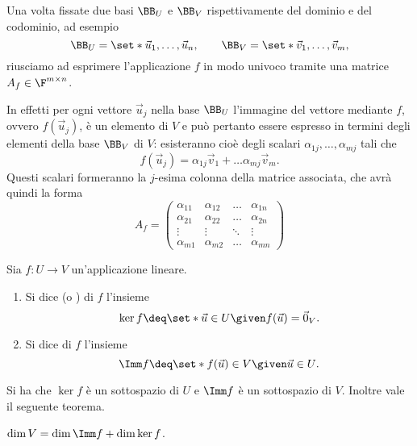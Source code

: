 Una volta fissate due basi $\BB_U$ e $\BB_V$ rispettivamente del dominio e del codominio, ad esempio \[
    \BB_U = \set*{\vec u_1, \dots, \vec u_n}, \qquad \BB_V = \set*{\vec v_1, \dots, \vec v_m},
\] riusciamo ad esprimere l'applicazione $f$ in modo univoco tramite una matrice $A_f \in \Mat{\F, m, n}$. 

In effetti per ogni vettore $\vec u_j$ nella base $\BB_U$ l'immagine del vettore mediante $f$, ovvero $f(\vec u_j)$, è un elemento di $V$ e può pertanto essere espresso in termini degli elementi della base $\BB_V$ di $V$: esisteranno cioè degli scalari $\alpha_{1j}, \dots, \alpha_{mj}$ tali che \[
    f(\vec u_j) = \alpha_{1j}\vec v_1 + \dots \alpha_{mj}\vec v_m.
\] Questi scalari formeranno la $j$-esima colonna della matrice associata, che avrà quindi la forma \[
    A_f = \begin{pmatrix}
        \alpha_{11} &\alpha_{12} &\dots    &\alpha_{1n} \\
        \alpha_{21} &\alpha_{22} &\dots    &\alpha_{2n} \\
        \vdots      &\vdots      &\ddots   &\vdots      \\
        \alpha_{m1} &\alpha_{m2} &\dots    &\alpha_{mn}
    \end{pmatrix}
\]

\begin{definition}
    Sia $f : U \to V$ un'applicazione lineare.
    \begin{enumerate}[(1)]
        \item Si dice  (o ) di $f$ l'insieme \[
            \ker f \deq \set*{\vec u \in U \given f(\vec u) = \vec 0_V}.
        \]
        \item Si dice  di $f$ l'insieme \[
            \Imm f \deq \set*{f(\vec u) \in V \given \vec u \in U}.
        \]
    \end{enumerate}
\end{definition}

Si ha che $\ker f$ è un sottospazio di $U$ e $\Imm f$ è un sottospazio di $V$. Inoltre vale il seguente teorema.

\begin{theorem}
     $\dim V = \dim \Imm f + \dim \ker f$. 
\end{theorem}